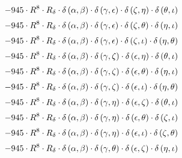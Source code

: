 \begin{subequations}
\begin{gather}
 \\[0.2em] \notag 		 - 945 \cdot R^{8} \cdot R_{\delta{}} \cdot \delta{}\left(\alpha{}, \beta{}\right) \cdot \delta{}\left(\gamma{}, \epsilon{}\right) \cdot \delta{}\left(\zeta{}, \eta{}\right) \cdot \delta{}\left(\theta{}, \iota{}\right) 
 \\[0.2em] \notag 		 - 945 \cdot R^{8} \cdot R_{\delta{}} \cdot \delta{}\left(\alpha{}, \beta{}\right) \cdot \delta{}\left(\gamma{}, \epsilon{}\right) \cdot \delta{}\left(\zeta{}, \theta{}\right) \cdot \delta{}\left(\eta{}, \iota{}\right) 
 \\[0.2em] \notag 		 - 945 \cdot R^{8} \cdot R_{\delta{}} \cdot \delta{}\left(\alpha{}, \beta{}\right) \cdot \delta{}\left(\gamma{}, \epsilon{}\right) \cdot \delta{}\left(\zeta{}, \iota{}\right) \cdot \delta{}\left(\eta{}, \theta{}\right) 
 \\[0.2em] \notag 		 - 945 \cdot R^{8} \cdot R_{\delta{}} \cdot \delta{}\left(\alpha{}, \beta{}\right) \cdot \delta{}\left(\gamma{}, \zeta{}\right) \cdot \delta{}\left(\epsilon{}, \eta{}\right) \cdot \delta{}\left(\theta{}, \iota{}\right) 
 \\[0.2em] \notag 		 - 945 \cdot R^{8} \cdot R_{\delta{}} \cdot \delta{}\left(\alpha{}, \beta{}\right) \cdot \delta{}\left(\gamma{}, \zeta{}\right) \cdot \delta{}\left(\epsilon{}, \theta{}\right) \cdot \delta{}\left(\eta{}, \iota{}\right) 
 \\[0.2em] \notag 		 - 945 \cdot R^{8} \cdot R_{\delta{}} \cdot \delta{}\left(\alpha{}, \beta{}\right) \cdot \delta{}\left(\gamma{}, \zeta{}\right) \cdot \delta{}\left(\epsilon{}, \iota{}\right) \cdot \delta{}\left(\eta{}, \theta{}\right) 
 \\[0.2em] \notag 		 - 945 \cdot R^{8} \cdot R_{\delta{}} \cdot \delta{}\left(\alpha{}, \beta{}\right) \cdot \delta{}\left(\gamma{}, \eta{}\right) \cdot \delta{}\left(\epsilon{}, \zeta{}\right) \cdot \delta{}\left(\theta{}, \iota{}\right) 
 \\[0.2em] \notag 		 - 945 \cdot R^{8} \cdot R_{\delta{}} \cdot \delta{}\left(\alpha{}, \beta{}\right) \cdot \delta{}\left(\gamma{}, \eta{}\right) \cdot \delta{}\left(\epsilon{}, \theta{}\right) \cdot \delta{}\left(\zeta{}, \iota{}\right) 
 \\[0.2em] \notag 		 - 945 \cdot R^{8} \cdot R_{\delta{}} \cdot \delta{}\left(\alpha{}, \beta{}\right) \cdot \delta{}\left(\gamma{}, \eta{}\right) \cdot \delta{}\left(\epsilon{}, \iota{}\right) \cdot \delta{}\left(\zeta{}, \theta{}\right) 
 \\[0.2em] \notag 		 - 945 \cdot R^{8} \cdot R_{\delta{}} \cdot \delta{}\left(\alpha{}, \beta{}\right) \cdot \delta{}\left(\gamma{}, \theta{}\right) \cdot \delta{}\left(\epsilon{}, \zeta{}\right) \cdot \delta{}\left(\eta{}, \iota{}\right) 

\end{gather}
\end{subequations}

